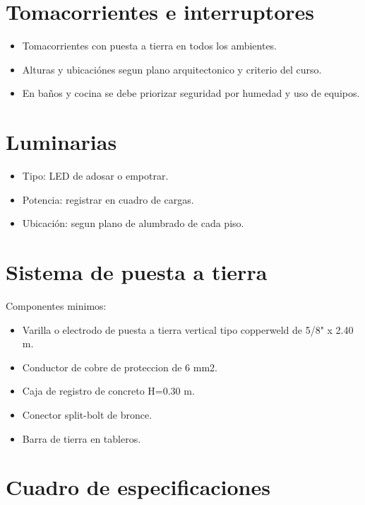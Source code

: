 \section{Tomacorrientes e interruptores}

\begin{itemize}
  \item Tomacorrientes con puesta a tierra en todos los ambientes.
  \item Alturas y ubicaciónes segun plano arquitectonico y criterio del curso.
  \item En baños y cocina se debe priorizar seguridad por humedad y uso de equipos.
\end{itemize}

\section{Luminarias}

\begin{itemize}
  \item Tipo: LED de adosar o empotrar.
  \item Potencia: registrar en cuadro de cargas.
  \item Ubicación: segun plano de alumbrado de cada piso.
\end{itemize}

\section{Sistema de puesta a tierra}

Componentes minimos:
\begin{itemize}
  \item Varilla o electrodo de puesta a tierra vertical tipo copperweld de 5/8" x 2.40 m.
  \item Conductor de cobre de proteccion de 6 mm2.
  \item Caja de registro de concreto H=0.30 m.
  \item Conector split-bolt de bronce.
  \item Barra de tierra en tableros.
\end{itemize}

\section{Cuadro de especificaciones}

